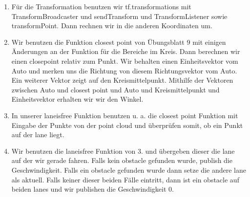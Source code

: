 \documentclass[10pt,oneside,a4paper]{article}
\begin{document}
	\newpage
	\begin{enumerate}
	    \item Für die Transformation benutzen wir tf.transformations mit TransformBroadcaster und sendTransform und TransformListener sowie transformPoint. Dann rechnen wir in die anderen Koordinaten um.
	    \item Wir benutzen die Funktion closest point von Übungsblatt 9 mit einigen Änderungen an der Funktion für die Bereiche im Kreis. Dann berechnen wir einen closepoint relativ zum Punkt. Wir behalten einen Einheitsvektor vom Auto und merken uns die Richtung von diesem Richtungsvektor vom Auto. Ein weiterer Vektor zeigt auf den Kreismittelpunkt. Mithilfe der Vektoren zwischen Auto und closest point und Auto und Kreismittelpunkt und Einheitsvektor erhalten wir wir den Winkel.
	    \item In unserer laneisfree Funktion benutzen u. a. die closest point Funktion mit Eingabe der Punkte von der point cloud und überprüfen somit, ob ein Punkt auf der lane liegt.
	    \item Wir benutzen die laneisfree Funktion von 3. und übergeben dieser die lane auf der wir gerade fahren. Falls kein obstacle gefunden wurde, publish die Geschwindigkeit. Falls ein obstacle gefunden wurde dann setze die andere lane als aktuell. Falls keiner dieser beiden Fälle eintritt, dann ist ein obstacle auf beiden lanes und wir publishen die Geschwindigkeit 0.
	\end{enumerate}
    
	\newpage
	
\end{document}
